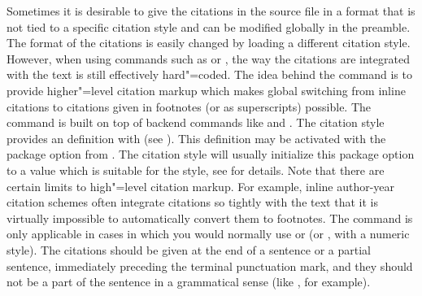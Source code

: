 Sometimes it is desirable to give the citations in the source file in a format that is not tied to a specific citation style and can be modified globally in the preamble. The format of the citations is easily changed by loading a different citation style. However, when using commands such as  or , the way the citations are integrated with the text is still effectively hard"=coded. The idea behind the  command is to provide higher"=level citation markup which makes global switching from inline citations to citations given in footnotes (or as superscripts) possible. The  command is built on top of backend commands like  and . The citation style provides an  definition with  (see ). This definition may be activated with the  package option from . The citation style will usually initialize this package option to a value which is suitable for the style, see  for details. Note that there are certain limits to high"=level citation markup. For example, inline author-year citation schemes often integrate citations so tightly with the text that it is virtually impossible to automatically convert them to footnotes. The  command is only applicable in cases in which you would normally use  or  (or , with a numeric style). The citations should be given at the end of a sentence or a partial sentence, immediately preceding the terminal punctuation mark, and they should not be a part of the sentence in a grammatical sense (like , for example).

